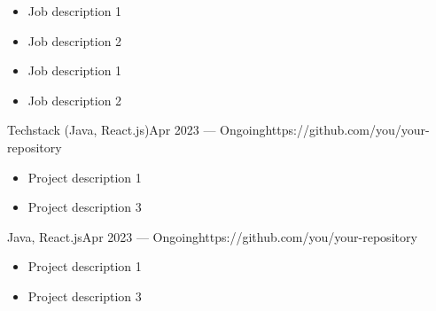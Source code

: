 \documentclass[10pt,a4paper,ragged2e,withhyper]{nextcv}
\begin{document}
\begin{paracol}{2}

\begin{itemize}
\item Job description 1
\item Job description 2
\end{itemize}

\divider%

\begin{itemize}
\item Job description 1
\item Job description 2
\end{itemize}



{Techstack (Java, React.js)}{Apr 2023 --- Ongoing}{https://github.com/you/your-repository}
\begin{itemize}
  \item Project description 1
  \item Project description 3
\end{itemize}

\divider%

{Java, React.js}{Apr 2023 --- Ongoing}{https://github.com/you/your-repository}
\begin{itemize}
  \item Project description 1
  \item Project description 3
\end{itemize}

\medskip




\medskip



\newpage




\end{paracol}
\end{document}
